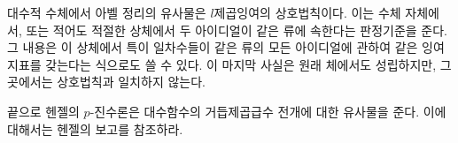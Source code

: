 대수적 수체에서 아벨 정리의 유사물은 \glqq{}\(l\)제곱잉여의 상호법칙\grqq{}이다. 이는 수체 자체에서, 또는 적어도 적절한 상체에서 두 아이디얼이 같은 류에 속한다는 판정기준을 준다. 그 내용은 이 상체에서 특이 일차수들이 같은 류의 모든 아이디얼에 관하여 같은 잉여지표를 갖는다는 식으로도 쓸 수 있다. 이 마지막 사실은 원래 체에서도 성립하지만, 그곳에서는 상호법칙과 일치하지 않는다.

끝으로 헨젤의 \(p\)-진수론은 대수함수의 거듭제곱급수 전개에 대한 유사물을 준다. 이에 대해서는 헨젤의 보고를 참조하라.

